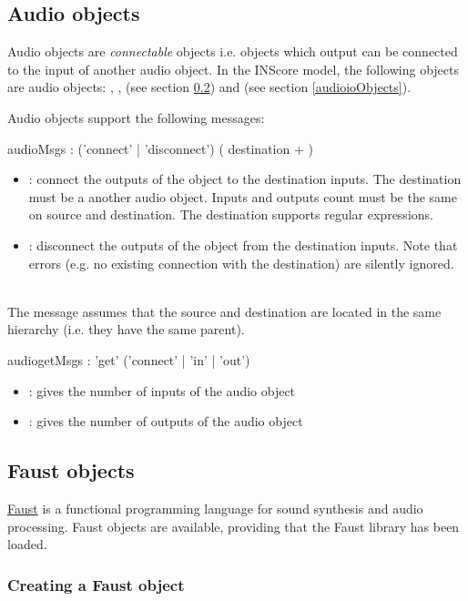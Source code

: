 \documentclass[a4paper,twoside]{article}
\newcommand{\sublevel}[1]	{\subsection{#1}}
\newcommand{\subsublevel}[1]	{\subsubsection{#1}}
\begin{document}
\sublevel{Audio objects}
\label{audioObjects}

Audio objects are \emph{connectable} objects i.e. objects which output can be connected to the input of another audio object. In the INScore model, the following objects are audio objects: , ,  (see section \ref{faustObjects}) and  (see section \ref{audioioObjects}).

Audio objects support the following messages:

\begin{rail}
audioMsgs : ('connect' | 'disconnect') ( destination + )
\end{rail}

\begin{itemize}
\item {}: connect the outputs of the object to the destination inputs. The destination must be a another audio object. Inputs and outputs count must be the same on source and destination. The destination supports regular expressions.
\item {}: disconnect the outputs of the object from the destination inputs. Note that errors (e.g. no existing connection with the destination) are silently ignored.
\end{itemize}

\note{}\\
The  message assumes that the source and destination are located in the same hierarchy (i.e. they have the same parent). 

\begin{rail}
audiogetMsgs : 'get' ('connect' | 'in' | 'out')
\end{rail}

\begin{itemize}
\item {}: gives the number of inputs of the audio object
\item {}: gives the number of outputs of the audio object
\end{itemize}

\sublevel{Faust objects}
\label{faustObjects}

\href{https://faust.grame.fr/}{Faust} is a functional programming language for sound synthesis and audio processing.
Faust objects are available, providing that the Faust library has been loaded.

\subsublevel{Creating a Faust object}
\label{webFaust}
\end{document}
